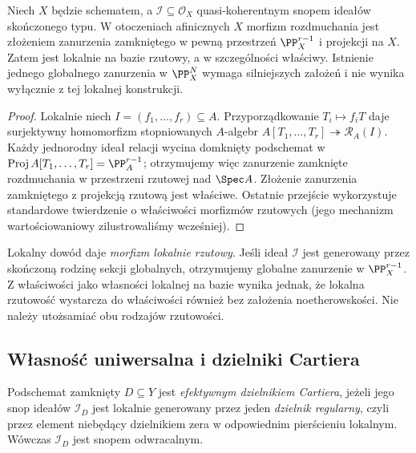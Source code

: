 \begin{stwierdzenie}
\label{st:ga5-blowup-proper}
Niech $X$ będzie schematem, a $\mathcal I\subseteq\mathcal O_X$
quasi-koherentnym snopem ideałów skończonego typu.
W otoczeniach afinicznych $X$ morfizm rozdmuchania jest
złożeniem zanurzenia zamkniętego w pewną przestrzeń
$\PP^{r-1}_X$ i projekcji na $X$. Zatem jest lokalnie
na bazie rzutowy, a w szczególności właściwy. Istnienie
jednego globalnego zanurzenia w $\PP^N_X$ wymaga
silniejszych założeń i nie wynika wyłącznie z tej lokalnej
konstrukcji.
\end{stwierdzenie}
\begin{proof}
Lokalnie niech $I=(f_1,\ldots,f_r)\subseteq A$.
Przyporządkowanie $T_i\mapsto f_iT$ daje surjektywny
homomorfizm stopniowanych $A$-algebr
$A[T_1,\ldots,T_r]\twoheadrightarrow\mathcal R_A(I)$.
Każdy jednorodny ideał relacji wycina domknięty
podschemat w $\operatorname{Proj}A[T_1,\ldots,T_r]
=\PP^{r-1}_A$; otrzymujemy więc zanurzenie zamknięte
rozdmuchania w przestrzeni rzutowej nad $\Spec A$.
Złożenie zanurzenia zamkniętego z projekcją rzutową
jest właściwe. Ostatnie przejście wykorzystuje standardowe
twierdzenie o właściwości morfizmów rzutowych (jego
mechanizm wartościowaniowy zilustrowaliśmy wcześniej).
\end{proof}

\begin{uwaga}
Lokalny dowód daje \emph{morfizm lokalnie rzutowy}.
Jeśli ideał $\mathcal I$ jest generowany przez skończoną
rodzinę sekcji globalnych, otrzymujemy globalne zanurzenie
w $\PP^{r-1}_X$. Z właściwości jako własności lokalnej
na bazie wynika jednak, że lokalna rzutowość wystarcza
do właściwości również bez założenia noetherowskości.
Nie należy utożsamiać obu rodzajów rzutowości.
\end{uwaga}

\subsection{Własność uniwersalna i dzielniki Cartiera}

\begin{definicja}
\label{def:ga5-cartier}
Podschemat zamknięty $D\subseteq Y$ jest \emph{efektywnym
dzielnikiem Cartiera}, jeżeli jego snop ideałów
$\mathcal I_D$ jest lokalnie generowany przez jeden
\emph{dzielnik regularny}, czyli przez element niebędący
dzielnikiem zera w odpowiednim pierścieniu lokalnym.
Wówczas $\mathcal I_D$ jest snopem odwracalnym.
\end{definicja}

